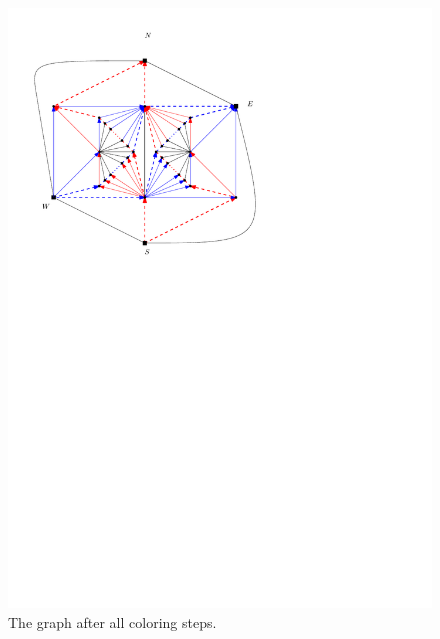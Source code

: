 \begin{figure}[h]
    \includegraphics[scale=.75]{fixExtension/img/manymany4}
    \caption{The graph after all coloring steps.}
    \label{fig:fix:manymany4}
  \end{figure}
